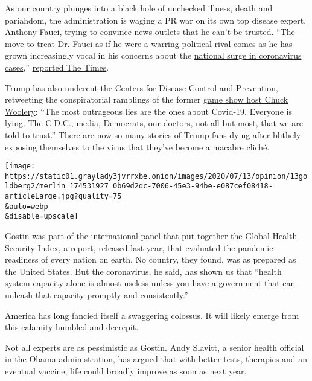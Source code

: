 As our country plunges into a black hole of unchecked illness, death and
pariahdom, the administration is waging a PR war on its own top disease
expert, Anthony Fauci, trying to convince news outlets that he can't be
trusted. ``The move to treat Dr. Fauci as if he were a warring political
rival comes as he has grown increasingly vocal in his concerns about the
\href{https://www.nytimes3xbfgragh.onion/interactive/2020/us/coronavirus-us-cases.html}{national
surge in coronavirus cases},''
\href{https://www.nytimes3xbfgragh.onion/2020/07/12/world/coronavirus-updates.html\#_blank}{reported
The Times}.

Trump has also undercut the Centers for Disease Control and Prevention,
retweeting the conspiratorial ramblings of the former
\href{https://twitter.com/chuckwoolery/status/1282499347117215745?s=20}{game
show host Chuck Woolery}: ``The most outrageous lies are the ones about
Covid-19. Everyone is lying. The C.D.C., media, Democrats, our doctors,
not all but most, that we are told to trust.'' There are now so many
stories of
\href{https://www.dailymail.co.uk/news/article-8515535/Ohio-man-37-dies-coronavirus-claiming-pandemic-just-hype-Facebook-post.html}{Trump
fans dying} after blithely exposing themselves to the virus that they've
become a macabre cliché.

\texttt{[image: https://static01.graylady3jvrrxbe.onion/images/2020/07/13/opinion/13goldberg2/merlin\_174531927\_0b69d2dc-7006-45e3-94be-e087cef08418-articleLarge.jpg?quality=75\\\&auto=webp\\\&disable=upscale]}

Gostin was part of the international panel that put together the
\href{https://www.ghsindex.org/}{Global Health Security Index}, a
report, released last year, that evaluated the pandemic readiness of
every nation on earth. No country, they found, was as prepared as the
United States. But the coronavirus, he said, has shown us that ``health
system capacity alone is almost useless unless you have a government
that can unleash that capacity promptly and consistently.''

America has long fancied itself a swaggering colossus. It will likely
emerge from this calamity humbled and decrepit.

Not all experts are as pessimistic as Gostin. Andy Slavitt, a senior
health official in the Obama administration,
\href{https://twitter.com/ASlavitt/status/1282465694664273922?s=20}{has
argued} that with better tests, therapies and an eventual vaccine, life
could broadly improve as soon as next year.

